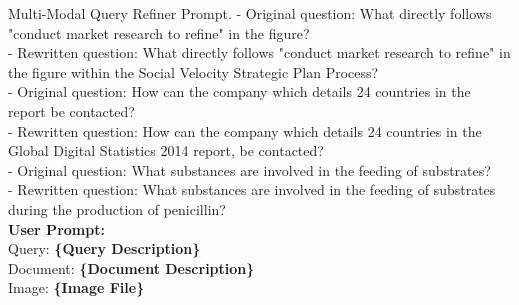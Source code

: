 \begin{figure*}[!ht]
\begin{AIbox}{Multi-Modal Query Refiner Prompt.}
- Original question: What directly follows "conduct market research to refine" in the figure?\\
- Rewritten question: What directly follows "conduct market research to refine" in the figure within the Social Velocity Strategic Plan Process?\\

- Original question: How can the company which details 24 countries in the report be contacted?\\
- Rewritten question: How can the company which details 24 countries in the Global Digital Statistics 2014 report, be contacted?\\

- Original question: What substances are involved in the feeding of substrates?\\
- Rewritten question: What substances are involved in the feeding of substrates during the production of penicillin?\\

\tcblower
{\color{black}\bf \large User Prompt:}\\
Query: {\color{deepblue}\bf \{Query Description\}} \\
Document: {\color{deepblue}\bf \{Document Description\}} \\
Image: {\color{deepblue}\bf \{Image File\}} \\

\end{AIbox}
\vspace{-1em}
\caption{Prompt of Multi-Modal Refiner.}
\label{fig: refiner}
\end{figure*}
